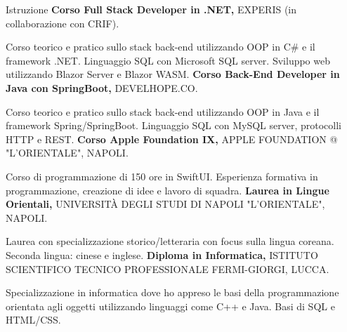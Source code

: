 \begin{rubric}{Istruzione}
%
    \textbf{Corso Full Stack Developer in .NET,} EXPERIS (in collaborazione con CRIF).
    \par Corso teorico e pratico sullo stack back-end utilizzando OOP in C\# e il framework .NET. Linguaggio SQL con Microsoft SQL server. Sviluppo web utilizzando Blazor Server e Blazor WASM.
%
%
    \textbf{Corso Back-End Developer in Java con SpringBoot,} DEVELHOPE.CO.
    \par Corso teorico e pratico sullo stack back-end utilizzando OOP in Java e il framework Spring/SpringBoot. Linguaggio SQL con MySQL server, protocolli HTTP e REST.
%
%
    \textbf{Corso Apple Foundation IX,} APPLE FOUNDATION @ "L'ORIENTALE", NAPOLI.
    \par Corso di programmazione di 150 ore in SwiftUI. Esperienza formativa in programmazione, creazione di idee e lavoro di squadra.
%
%
    \textbf{Laurea in Lingue Orientali,} UNIVERSITÀ DEGLI STUDI DI NAPOLI "L'ORIENTALE", NAPOLI.
    \par Laurea con specializzazione storico/letteraria con focus sulla lingua coreana. Seconda lingua: cinese e inglese.
%
%
    \textbf{Diploma in Informatica,} ISTITUTO SCIENTIFICO TECNICO PROFESSIONALE FERMI-GIORGI, LUCCA.
    \par Specializzazione in informatica dove ho appreso le basi della programmazione orientata agli oggetti utilizzando linguaggi come C++ e Java. Basi di SQL e HTML/CSS.
%
\end{rubric}